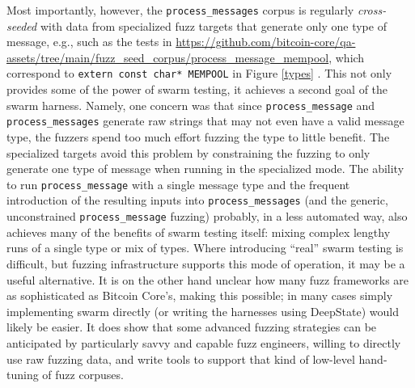 \begin{sloppypar}
Most importantly, however, the {\tt process\_messages} corpus is regularly \emph{cross-seeded} with data from specialized fuzz targets that generate only one type of message, e.g., such as the tests in \url{https://github.com/bitcoin-core/qa-assets/tree/main/fuzz_seed_corpus/process\_message\_mempool}, which correspond to {\tt extern const char* MEMPOOL} in Figure \ref{types} .  This not only provides some of the power of swarm testing, it achieves a second goal of the swarm harness.  Namely, one concern was that since {\tt process\_message} and {\tt process\_messages} generate raw strings that may not even have a valid message type,  the fuzzers spend too much effort fuzzing the type to little benefit.  The specialized targets avoid this problem by constraining the fuzzing to only generate one type of message when running in the specialized mode.  The ability to run {\tt process\_message} with a single message type and the frequent introduction of the resulting inputs into {\tt process\_messages} (and the generic, unconstrained {\tt process\_message} fuzzing) probably, in a less automated way, also  achieves many of the benefits of swarm testing itself:  mixing complex lengthy runs of a single type or mix of types.  Where introducing ``real'' swarm testing is difficult, but fuzzing infrastructure supports this mode of operation, it may be a useful alternative.  It is on the other hand unclear how many fuzz frameworks are as sophisticated as Bitcoin Core's, making this possible; in many cases simply implementing swarm directly (or writing the harnesses using DeepState) would likely be easier.  It does show that some advanced fuzzing strategies can be anticipated by particularly savvy and capable fuzz engineers, willing to directly use raw fuzzing data, and write tools to support that kind of low-level hand-tuning of fuzz corpuses.

\end{sloppypar}